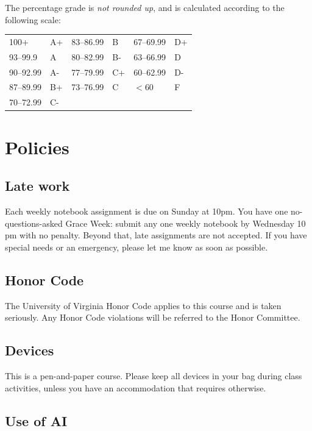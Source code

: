 \documentclass[oneside,11pt]{amsart}
\begin{document}
The percentage grade is \emph{not rounded up}, and is calculated
according to the following scale:
\begin{center}
\begin{tabular}{ll|ll|ll}
100+ & A+ & 83--86.99 & B & 67--69.99 & D+ \\
93--99.9 & A & 80--82.99 & B- & 63--66.99 & D \\
90--92.99 & A- & 77--79.99 & C+ & 60--62.99 & D- \\
87--89.99 & B+ & 73--76.99 & C & $<60$ & F \\
70--72.99 & C- & & \\
\end{tabular}
\end{center}


\section{Policies}

\subsection{Late work}

Each weekly notebook assignment is due on Sunday at 10pm.
You have one no-questions-asked Grace Week: submit any one weekly notebook by Wednesday 10 pm with no penalty. Beyond that,
late assignments are not accepted.
If you have special needs or an emergency, please let me know as soon as possible.

\subsection{Honor Code}
The University of Virginia Honor Code applies to this course and is taken seriously. Any Honor Code violations will be referred to the Honor Committee.

\subsection{Devices}

This is a pen-and-paper course. Please keep all devices in your bag during class activities, unless you have an accommodation that requires otherwise.

\subsection{Use of AI}
\end{document}
